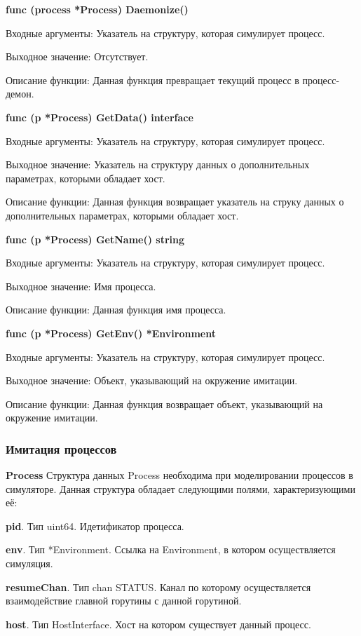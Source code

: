 \textbf{func (process *Process) Daemonize() }

Входные аргументы: Указатель на структуру, которая симулирует процесс.

Выходное значение: Отсутствует.

Описание функции: Данная функция превращает текущий процесс в процесс-демон.


\textbf{func (p *Process) GetData() interface}

Входные аргументы: Указатель на структуру, которая симулирует процесс.

Выходное значение: Указатель на структуру данных о дополнительных параметрах, которыми обладает хост.

Описание функции: Данная функция возвращает указатель на струку данных о дополнительных параметрах, которыми обладает хост.


\textbf{func (p *Process) GetName() string}

Входные аргументы: Указатель на структуру, которая симулирует процесс.

Выходное значение: Имя процесса.

Описание функции: Данная функция имя процесса.

\textbf{func (p *Process) GetEnv() *Environment}

Входные аргументы: Указатель на структуру, которая симулирует процесс.

Выходное значение: Объект, указывающий на окружение имитации.

Описание функции: Данная функция возвращает объект, указывающий на окружение имитации.

\subsubsection{Имитация процессов}
\textbf{Process}
Структура данных Process необходима при моделировании процессов в симуляторе. Данная структура обладает следующими полями, характеризующими  её:

\textbf{	pid}. Тип uint64. Идетификатор процесса. 

\textbf{	env}. Тип        *Environment. Ссылка на Environment, в котором осуществляется симуляция. 

\textbf{	resumeChan}. Тип chan STATUS. Канал по которому осуществляется взаимодействие главной горутины с данной горутиной. 

\textbf{	host}. Тип       HostInterface. Хост на котором существует данный процесс. 

